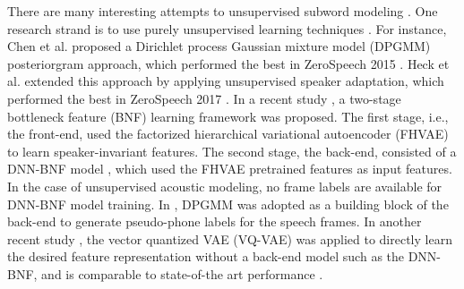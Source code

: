 \documentclass[a4paper]{article}
\begin{document}
There are many interesting attempts  to unsupervised subword modeling \cite{chen2015parallel,heck2017feature,chorowski2019unsupervised,shibata2017composite,feng2019_TASLP,riviere2020unsupervised,Feng2019combining}. One research strand is to use purely unsupervised learning techniques 
\cite{chen2015parallel,heck2017feature,chorowski2019unsupervised}. For instance, Chen et al. \cite{chen2015parallel} proposed a Dirichlet process Gaussian mixture model (DPGMM) posteriorgram approach, which performed the best in ZeroSpeech 2015 \cite{versteegh2015zero}.  Heck et al. extended this approach by applying unsupervised speaker adaptation, which performed the best in ZeroSpeech 2017 \cite{heck2017feature}. 
In a recent study \cite{Feng2019improving}, a two-stage bottleneck feature (BNF) learning framework was proposed.
The first stage, i.e., the front-end, used the factorized hierarchical variational autoencoder (FHVAE) \cite{hsu2017nips} to learn speaker-invariant features. The second stage, the back-end, consisted of a DNN-BNF model \cite{chen2017multilingual}, which used the FHVAE pretrained features as input features. In the case of unsupervised acoustic modeling, no frame labels are available for DNN-BNF model training.
In \cite{Feng2019improving},
 DPGMM was adopted  {\color{blue} as a building block of the back-end} to generate pseudo-phone labels for the speech frames.
In another recent study  \cite{chorowski2019unsupervised}, the vector quantized VAE (VQ-VAE) \cite{oord2017neural} was applied to directly learn the desired feature representation without a back-end model such as the DNN-BNF, and is comparable to state-of-the art performance \cite{heck2017feature}. 
\end{document}
